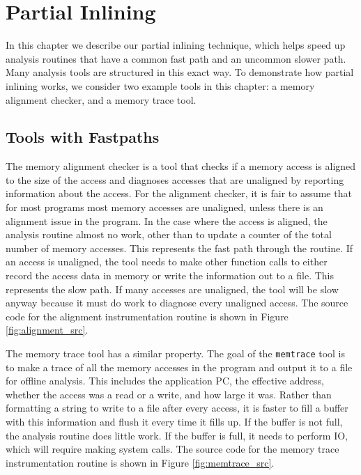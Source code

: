 \chapter{Partial Inlining}
\label{sec:partial_inlining}

In this chapter we describe our partial inlining technique, which helps speed up
analysis routines that have a common fast path and an uncommon slower path.
Many analysis tools are structured in this exact way.  To demonstrate how
partial inlining works, we consider two example tools in this chapter: a memory
alignment checker, and a memory trace tool.

\section{Tools with Fastpaths}

The memory alignment checker is a tool that checks if a memory access is aligned
to the size of the access and diagnoses accesses that are unaligned by reporting
information about the access.  For the alignment checker, it is fair to assume
that for most programs most memory accesses are unaligned, unless there is an
alignment issue in the program.  In the case where the access is aligned, the
analysis routine almost no work, other than to update a counter of the total
number of memory accesses.  This represents the fast path through the routine.
If an access is unaligned, the tool needs to make other function calls to either
record the access data in memory or write the information out to a file.  This
represents the slow path.  If many accesses are unaligned, the tool will be slow
anyway because it must do work to diagnose every unaligned access.  The source
code for the alignment instrumentation routine is shown in Figure
\ref{fig:alignment_src}.

The memory trace tool has a similar property.  The goal of the {\tt memtrace}
tool is to make a trace of all the memory accesses in the program and output it
to a file for offline analysis.  This includes the application PC, the effective
address, whether the access was a read or a write, and how large it was.  Rather
than formatting a string to write to a file after every access, it is faster to
fill a buffer with this information and flush it every time it fills up.  If the
buffer is not full, the analysis routine does little work.  If the buffer is
full, it needs to perform IO, which will require making system calls.  The
source code for the memory trace instrumentation routine is shown in Figure
\ref{fig:memtrace_src}.

